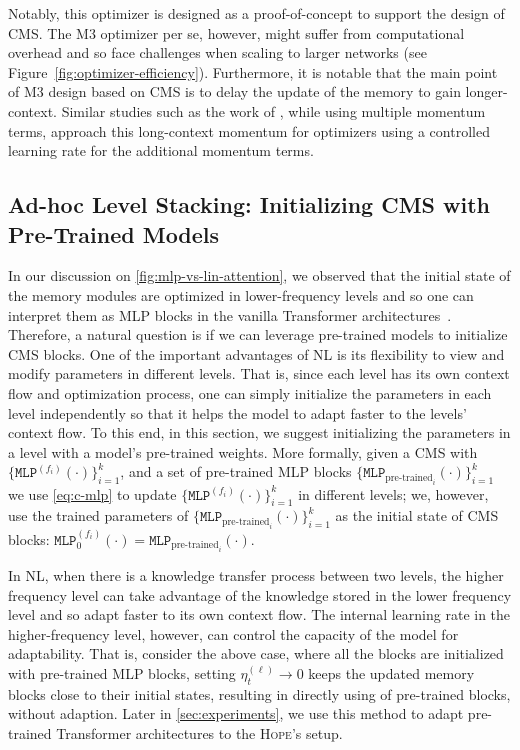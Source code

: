 \documentclass{article}
\newcommand{\citep}{\parencite}
\newcommand{\citet}{\textcite}
\newcommand{\headdot}[1]{\vspace{1.7mm}\noindent{{\textcolor{c4}{\bf #1}}}}
\newcommand{\model}[0]{\textsc{Hope}}
\begin{document}
{Notably, this optimizer is designed as a proof-of-concept to support the design of CMS. The M3 optimizer per se, however, might suffer from computational overhead and so face challenges when scaling to larger networks (see Figure~\ref{fig:optimizer-efficiency}). Furthermore, it is notable that the main point of M3 design based on CMS is to delay the update of the memory to gain longer-context. Similar studies such as the work of \citet{pagliardini2025the, ueaj2025multiscalemuon}, while using multiple momentum terms, approach this long-context momentum for optimizers using a controlled learning rate for the additional momentum terms.   

\subsection{Ad-hoc Level Stacking: Initializing CMS with Pre-Trained Models}\label{sec:pre-trained-mlp} 
In our discussion on \autoref{fig:mlp-vs-lin-attention}, we observed that the initial state of the memory modules are optimized in lower-frequency levels and so one can interpret them as MLP blocks in the vanilla Transformer architectures~\citep{transformers}. Therefore, a natural question is if we can leverage pre-trained models to initialize CMS blocks. One of the important advantages of NL is its flexibility to view and modify parameters in different levels. That is, since each level has its own context flow and optimization process, one can simply initialize the parameters in each level independently so that it helps the model to adapt faster to the levels' context flow. To this end, in this section, we suggest initializing the parameters in a level with a model's pre-trained weights. More formally, given a CMS with $\{\texttt{MLP}^{(f_i)}(\cdot)\}_{i = 1}^{k}$, and a set of pre-trained MLP blocks $\{\texttt{MLP}_{\text{pre-trained}_i}(\cdot)\}_{i=1}^{k}$ we use \autoref{eq:c-mlp} to update $\{\texttt{MLP}^{(f_i)}(\cdot)\}_{i = 1}^{k}$ in different levels; we, however, use the trained parameters of $\{\texttt{MLP}_{\text{pre-trained}_i}(\cdot)\}_{i=1}^{k}$ as the initial state of CMS blocks: $\texttt{MLP}^{(f_i)}_0(\cdot) = \texttt{MLP}_{\text{pre-trained}_i}(\cdot)$. 

\headdot{Why This Initialization Should Work?} In NL, when there is a knowledge transfer process between two levels, the higher frequency level can take advantage of the knowledge stored in the lower frequency level and so adapt faster to its own context flow. The internal learning rate in the higher-frequency level, however, can control the capacity of the model for adaptability. That is, consider the above case, where all the blocks are initialized with pre-trained MLP blocks, setting $\eta_t^{(\ell)} \rightarrow 0$ keeps the updated memory blocks close to their initial states, resulting in directly using of pre-trained blocks, without adaption. Later in \autoref{sec:experiments}, we use this method to adapt pre-trained Transformer architectures to the \model's setup.    

}
\end{document}
